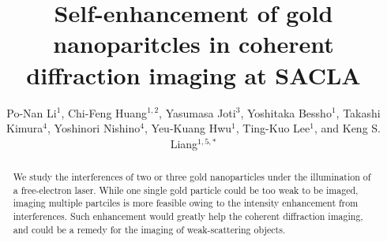 \documentclass[10pt,letterpaper]{article}
\begin{document}
\title{Self-enhancement of gold nanoparitcles in coherent diffraction imaging at SACLA}

\author{Po-Nan Li$^1$, Chi-Feng Huang$^{1,2}$, Yasumasa Joti$^3$, Yoshitaka Bessho$^1$, 
Takashi Kimura$^4$, Yoshinori Nishino$^4$, Yeu-Kuang Hwu$^1$, Ting-Kuo Lee$^1$, 
and Keng S. Liang$^{1,5,*}$}

\address{$^1$Institute of Physics, Academia Sinica, Taipei 11529, Taiwan\\
	$^2$Department of Applied Chemistry, National Chiao Tung University, Hsinchu 30010, Taiwan\\
	$^3$Japan Synchrotron Radiation Research Institute/SPring-8, Hyogo 679-5198, Japan\\
	$^4$Research Institute for Electronics Science, Hokkaido University, Sapporo 001-0021, Japan\\
	$^5$Department of Electrophysics, National Chiao Tung University, Hsinchu 30010, Taiwan\\
	}


	




\begin{abstract}
We study the interferences of two or three gold nanoparticles under the illumination of a free-electron laser. 
While one single gold particle could be too weak to be imaged, imaging multiple partciles is more feasible owing to the intensity enhancement from interferences. 
Such enhancement would greatly help the coherent diffraction imaging, and could be a remedy for the imaging of weak-scattering objects.
\end{abstract}


\end{document}
